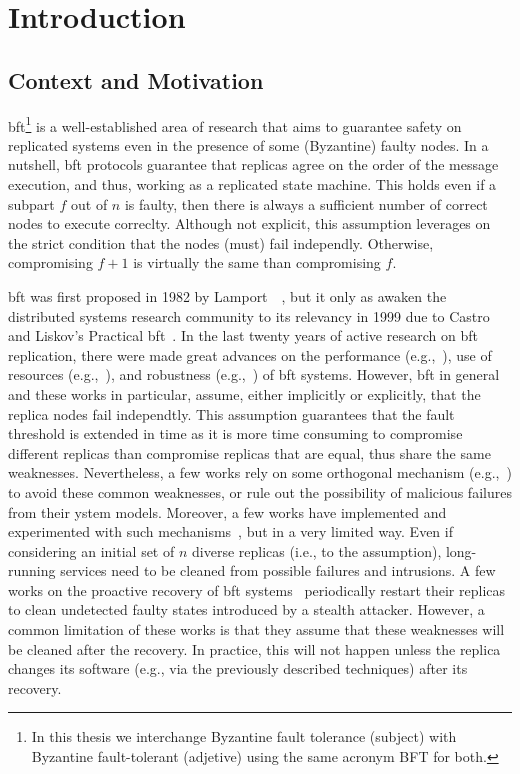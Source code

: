 \chapter{Introduction}
\label{chap:introduction}

\section{Context and Motivation}
\gls{bft}\footnote{In this thesis we interchange Byzantine fault tolerance (subject) with Byzantine fault-tolerant (adjetive) using the same acronym BFT for both.} is a well-established area of research that aims to guarantee safety on replicated systems even in the presence of some (Byzantine) faulty nodes.
In a nutshell, \gls{bft} protocols guarantee that replicas agree on the order of the message execution, and thus, working as a replicated state machine.
This holds even if a subpart $f$ out of $n$ is faulty, then there is always a sufficient number of correct nodes to execute correclty.
Although not explicit, this assumption leverages on the strict condition that the nodes (must) fail independly.
Otherwise, compromising $f+1$ is virtually the same than compromising $f$.


\gls{bft} was first proposed in 1982 by Lamport~\etal{}~\cite{Lamport:1982}, but it only as awaken the distributed systems research community to its relevancy in 1999 due to Castro and Liskov's Practical \gls{bft}~\cite{Castro:1999}. 
In the last twenty years of active research on \gls{bft} replication, there were made great advances on the performance (e.g.,~\cite{Kotla:2010,Aublin:2015,Behl:2015}), use of resources (e.g.,~\cite{Yin:2003,Wood:2011,Veronese:2013,Liu:2016,Behl:2017}), and robustness (e.g.,~\cite{Amir:2011,Bessani:2014,Clement:2009b}) of \gls{bft} systems.
However, \gls{bft} in general and these works in particular, assume, either implicitly or explicitly, that the replica nodes fail independtly. 
This assumption guarantees that the fault threshold is extended in time as it is more time consuming to compromise different replicas than compromise replicas that are equal, thus share the same weaknesses.
Nevertheless, a few works rely on some orthogonal mechanism (e.g.,~\cite{Roeder:2010,Chen:1995}) to avoid these common weaknesses, or rule out the possibility of malicious failures from their ystem models.
Moreover, a few works have implemented and experimented with such mechanisms~\cite{Rodrigues:2001,Roeder:2010,Amir:2011}, but in a very limited way.
Even if considering an initial set of $n$ diverse replicas (i.e., to the assumption), long-running services need to be cleaned from possible failures and intrusions.
A few works on the proactive recovery of \gls{bft} systems~\cite{Castro:2002,Sousa:2010,Roeder:2010,Platania:2014,Distler:2011} periodically restart their replicas to clean undetected faulty states introduced by a stealth attacker. 
However, a common limitation of these works is that they assume that these weaknesses will be cleaned after the recovery.
In practice, this will not happen unless the replica changes its software (e.g., via the previously described techniques) after its recovery.



